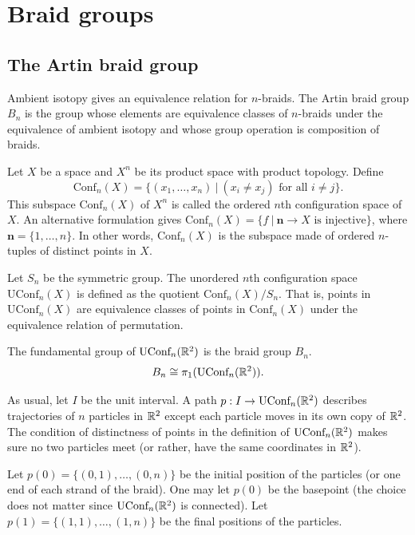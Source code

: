 \chapter{Braid groups}
\label{chapter2}
 
\section{The Artin braid group}

Ambient isotopy gives an equivalence relation for $n$-braids. The Artin braid group $B_n$ is the group whose elements are equivalence classes of $n$-braids under the equivalence of ambient isotopy and whose group operation is composition of braids.

Let $X$ be a space and $X^n$ be its product space with product topology. Define 
\begin{equation}
\label{eq:7}
  \text{Conf}_n(X) = \{ (x_1, \ldots, x_n) \ |\ (x_i \ne x_j) \text{ for all } i \ne j\}.
\end{equation}
This subspace $\text{Conf}_n(X)$ of $X^n$ is called the ordered $n$th configuration space of $X$. An alternative formulation gives $\text{Conf}_n(X) = \{ f \ | \ \mathbf{n} \to X \text{ is injective} \}$, where $\mathbf{n} = \{1, \ldots, n\}$. In other words, $\text{Conf}_n(X)$ is the subspace made of ordered $n$-tuples of distinct points in $X$.

Let $S_n$ be the symmetric group. The unordered $n$th configuration space $\text{UConf}_n(X)$ is defined as the quotient $\text{Conf}_n(X)/S_n$. That is, points in $\text{UConf}_n(X)$ are equivalence classes of points in $\text{Conf}_n(X)$ under the equivalence relation of permutation.

\begin{theorem}
\label{sec:artin-braid-group-1}
The fundamental group of $\text{UConf}_n(\mathbb{R}^2)$ is the braid group $B_n$. 
\begin{equation}
\label{eq:9}
B_n \cong \pi_1(\text{UConf}_n(\mathbb{R}^2)).
\end{equation}
\end{theorem}

As usual, let $I$ be the unit interval. A path $p: I \to \text{UConf}_n(\mathbb{R}^2)$ describes trajectories of $n$ particles in $\mathbb{R}^2$ except each particle moves in its own copy of $\mathbb{R}^2$. The condition of distinctness of points in the definition of $\text{UConf}_n(\mathbb{R}^2)$ makes sure no two particles meet (or rather, have the same coordinates in $\mathbb{R}^2$).

Let $p(0) = \{ (0,1), \ldots, (0,n) \}$ be the initial position of the particles (or one end of each strand of the braid). One may let $p(0)$ be the basepoint (the choice does not matter since $\text{UConf}_n(\mathbb{R}^2)$ is connected). Let $p(1) = \{ (1,1), \dots, (1,n) \}$ be the final positions of the particles.

